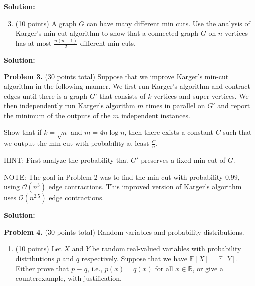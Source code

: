 \documentclass[11pt]{article}
\newcommand{\Ex}[1]{\ensuremath{\mathbb{E}\left[#1\right]}}
\begin{document}
\noindent\textbf{Solution:}















\begin{enumerate}
\setcounter{enumi}{2}
\item (10 points)
A graph $G$ can have many different min cuts. 
Use the analysis of Karger's min-cut algorithm to show that a connected graph $G$ on $n$ vertices has at most $\frac{n(n-1)}{2}$ different min cuts. 
\end{enumerate}

\noindent\textbf{Solution:}











\newpage\noindent
\textbf{Problem 3.} (30 points total)
Suppose that we improve Karger's min-cut algorithm in the following manner. 
We first run Karger's algorithm and contract edges until there is a graph $G$' that consists of $k$ vertices and super-vertices. 
We then independently run Karger's algorithm $m$ times in parallel on $G'$ and report the minimum of the outputs of the $m$ independent instances. 

\vskip 0.1in\noindent
Show that if $k=\sqrt{n}$ and $m=4n\log n$, then there exists a constant $C$ such that we output the min-cut with probability at least $\frac{C}{n}$. 

\vskip 0.1in\noindent
HINT: First analyze the probability that $G'$ preserves a fixed min-cut of $G$. 

\vskip 0.1in\noindent
NOTE: The goal in Problem 2 was to find the min-cut with probability $0.99$, using $\mathcal{O}(n^3)$ edge contractions. 
This improved version of Karger's algorithm uses $\mathcal{O}(n^{2.5})$ edge contractions. 

\vskip 0.4in
\noindent\textbf{Solution:}







\newpage\noindent
\textbf{Problem 4.} (30 points total)
Random variables and probability distributions. 
\begin{enumerate}
\item (10 points)
Let $X$ and $Y$ be random real-valued variables with probability distributions $p$ and $q$ respectively. 
Suppose that we have $\Ex{X}=\Ex{Y}$. 
Either prove that $p\equiv q$, i.e., $p(x)=q(x)$ for all $x\in\mathbb{R}$, or give a counterexample, with justification. 
\end{enumerate}
\end{document}
